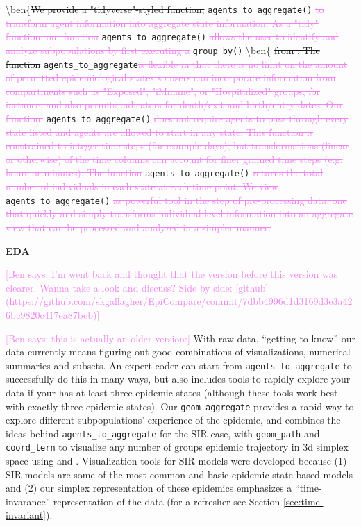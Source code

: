 \documentclass[
  shortnames]{jss}
\begin{document}
\textbackslash ben\{\sout{We provide a "tidyverse"-styled function, }\texttt{agents\_to\_aggregate()}\textcolor{violet}{\sout{ to transform agent information into aggregate state information.  As a "tidy" function, our function }}\texttt{agents\_to\_aggregate()}
\textcolor{violet}{\sout{allows the user to identify and analyze subpopulations by first executing a }}\texttt{group\_by()}
\textbackslash ben\{\sout{{ from . The function }}\texttt{agents\_to\_aggregate}\textcolor{violet}{\sout{is flexible in that there is no limit on the amount of permitted epidemiological states so users can incorporate information from compartments such as "Exposed", "iMmune", or "Hospitalized" groups, for instance, and also permits indicators for death/exit and birth/entry dates. Our function,}}
\texttt{agents\_to\_aggregate()}\textcolor{violet}{\sout{ does not require agents to pass through every state listed and agents are allowed to start in any state. This function is constrained to integer time steps (for example days), but transformations (linear or otherwise) of the time columns can account for finer grained time steps (e.g. hours or minutes). The function }}\texttt{agents\_to\_aggregate()}\textcolor{violet}{\sout{ returns the total number of individuals in each state at each time point.  We view }}\texttt{agents\_to\_aggregate()}\textcolor{violet}{\sout{ as powerful tool in the step of pre-processing data, one that quickly and simply transforms individual level information into an aggregate view that can be processed and analyzed in a simpler manner.}}

\textbf{EDA}

\textcolor{violet}{[Ben says: I'm went back and thought that the version before this version was clearer. Wanna take a look and discuss? Side by side: [github](https://github.com/skgallagher/EpiCompare/commit/7dbb4996d1d3169d3e3a426bc9820c417ea87beb)]}

\textcolor{violet}{[Ben says: this is actually an older version:]} With
raw data, ``getting to know'' our data currently means figuring out good
combinations of visualizations, numerical summaries and subsets. An
expert coder can start from \texttt{agents\_to\_aggregate} to
successfully do this in many ways, but  also includes
tools to rapidly explore your data if your has at least three epidemic
states (although these tools work best with exactly three epidemic
states). Our \texttt{geom\_aggregate} provides a rapid way to explore
different subpopulations' experience of the epidemic, and combines the
ideas behind \texttt{agents\_to\_aggregate} for the SIR case, with
\texttt{geom\_path} and \texttt{coord\_tern} to visualize any number of
groups epidemic trajectory in 3d simplex space using  and
 \citep{Wickham2016, Hamilton2018}. Visualization tools for
SIR models were developed because (1) SIR models are some of the most
common and basic epidemic state-based models and (2) our simplex
representation of these epidemics emphasizes a ``time-invarance''
representation of the data (for a refresher see Section
\ref{sec:time-invariant}).
\end{document}

